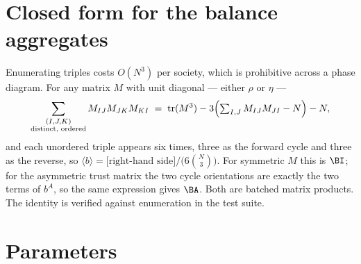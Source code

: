 \section{Closed form for the balance aggregates}
\label{app:closed-form}

Enumerating triples costs $O(N^{3})$ per society, which is prohibitive across a
phase diagram. For any matrix $M$ with unit diagonal --- either $\rho$ or $\eta$ ---
%
\begin{equation}
  \sum_{\substack{(I,J,K)\\ \text{distinct, ordered}}} M_{IJ}M_{JK}M_{KI}
  \;=\; \operatorname{tr}(M^{3}) - 3\Bigl(\textstyle\sum_{I,J}M_{IJ}M_{JI} - N\Bigr) - N ,
\end{equation}
%
and each unordered triple appears six times, three as the forward cycle and three
as the reverse, so
$\langle b\rangle = \bigl[\text{right-hand side}\bigr]/\bigl(6\binom{N}{3}\bigr)$.
For symmetric $M$ this is $\BI$; for the asymmetric trust matrix the two cycle
orientations are exactly the two terms of $b^{A}$, so the same expression gives
$\BA$. Both are batched matrix products. The identity is verified against
enumeration in the test suite.

\section{Parameters}
\label{app:parameters}


